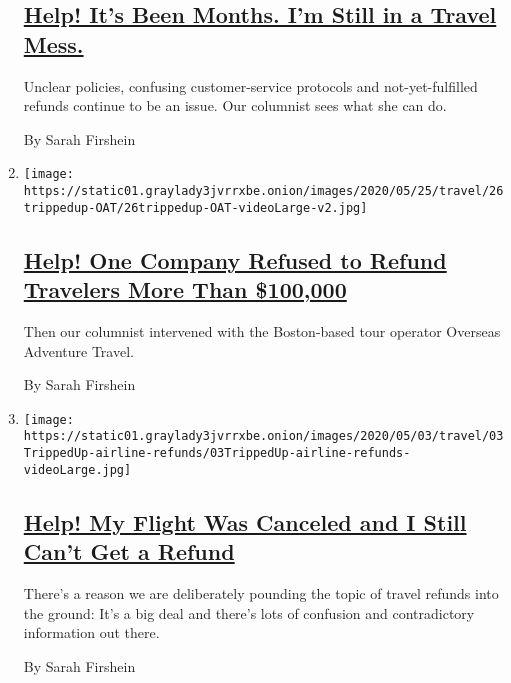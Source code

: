 \begin{enumerate}
  \hypertarget{help-its-been-months-im-still-in-a-travel-mess}{%
  \subsection{\texorpdfstring{\href{/2020/06/18/travel/travel-refunds-airlines.html}{Help!
  It's Been Months. I'm Still in a Travel
  Mess.}}{Help! It's Been Months. I'm Still in a Travel Mess.}}\label{help-its-been-months-im-still-in-a-travel-mess}}

  Unclear policies, confusing customer-service protocols and
  not-yet-fulfilled refunds continue to be an issue. Our columnist sees
  what she can do.

  By Sarah Firshein
\item
  \texttt{[image: https://static01.graylady3jvrrxbe.onion/images/2020/05/25/travel/26trippedup-OAT/26trippedup-OAT-videoLarge-v2.jpg]}

  \hypertarget{help-one-company-refused-to-refund-travelers-more-than-100000}{%
  \subsection{\texorpdfstring{\href{/2020/05/25/travel/coronavirus-refunds-overseas-adventure-travel.html}{Help!
  One Company Refused to Refund Travelers More Than
  \$100,000}}{Help! One Company Refused to Refund Travelers More Than \$100,000}}\label{help-one-company-refused-to-refund-travelers-more-than-100000}}

  Then our columnist intervened with the Boston-based tour operator
  Overseas Adventure Travel.

  By Sarah Firshein
\item
  \texttt{[image: https://static01.graylady3jvrrxbe.onion/images/2020/05/03/travel/03TrippedUp-airline-refunds/03TrippedUp-airline-refunds-videoLarge.jpg]}

  \hypertarget{help-my-flight-was-canceled-and-i-still-cant-get-a-refund}{%
  \subsection{\texorpdfstring{\href{/2020/05/01/travel/trip-refund-airlines.html}{Help!
  My Flight Was Canceled and I Still Can't Get a
  Refund}}{Help! My Flight Was Canceled and I Still Can't Get a Refund}}\label{help-my-flight-was-canceled-and-i-still-cant-get-a-refund}}

  There's a reason we are deliberately pounding the topic of travel
  refunds into the ground: It's a big deal and there's lots of confusion
  and contradictory information out there.

  By Sarah Firshein
\end{enumerate}

